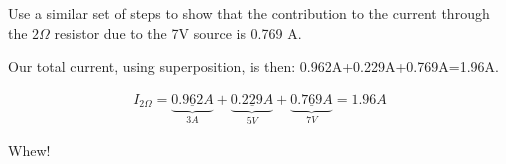 \begin{clevel}
Use a similar set of steps to show that the contribution to the current through the $2 \Omega$ resistor due to the 7V source is 0.769 A.
\end{clevel}

Our total current, using superposition, is then: 0.962A+0.229A+0.769A=1.96A.

\begin{align}
I_{2\Omega}=\underbrace{\underline{0.962A}}_{3A}+\underbrace{\underline{0.229A}}_{5V}
+\underbrace{\underline{0.769A}}_{7V} = 1.96A
\end{align}

Whew!

